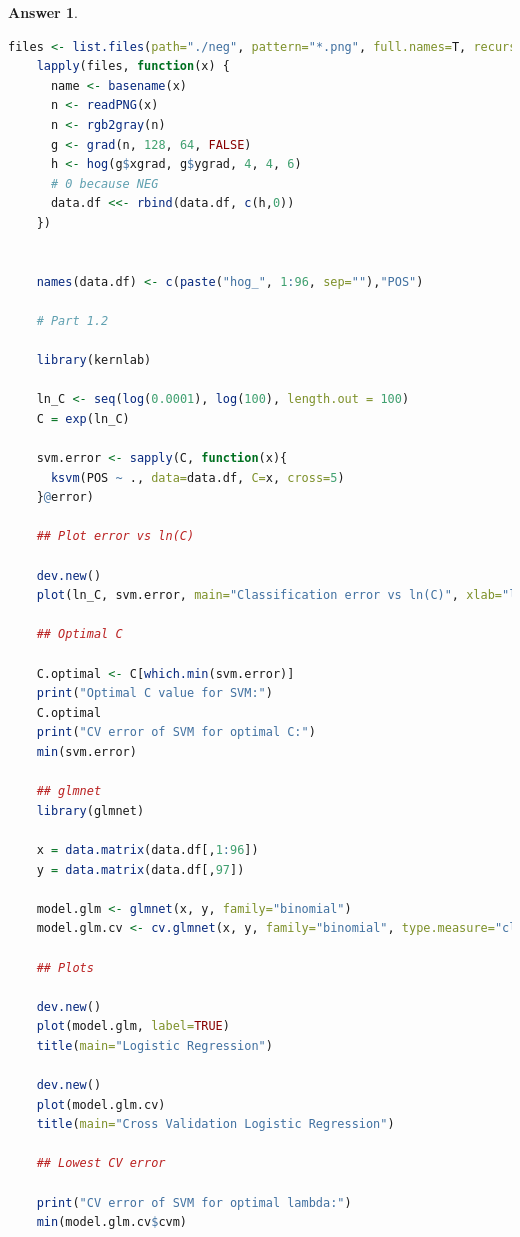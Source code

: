 \documentclass[12pt]{article}
\theoremstyle{colon}
\newtheorem*{answer}{Answer}
\begin{document}
\begin{answer}
\begin{lstlisting}[language=R, basicstyle=\scriptsize, breaklines=true]
    files <- list.files(path="./neg", pattern="*.png", full.names=T, recursive=FALSE)
    lapply(files, function(x) {
      name <- basename(x)
      n <- readPNG(x)
      n <- rgb2gray(n)
      g <- grad(n, 128, 64, FALSE)
      h <- hog(g$xgrad, g$ygrad, 4, 4, 6)
      # 0 because NEG
      data.df <<- rbind(data.df, c(h,0))
    })


    names(data.df) <- c(paste("hog_", 1:96, sep=""),"POS")

    # Part 1.2

    library(kernlab)

    ln_C <- seq(log(0.0001), log(100), length.out = 100)
    C = exp(ln_C)

    svm.error <- sapply(C, function(x){
      ksvm(POS ~ ., data=data.df, C=x, cross=5)
    }@error)

    ## Plot error vs ln(C)

    dev.new()
    plot(ln_C, svm.error, main="Classification error vs ln(C)", xlab="ln(C)", ylab="Error")

    ## Optimal C

    C.optimal <- C[which.min(svm.error)]
    print("Optimal C value for SVM:")
    C.optimal
    print("CV error of SVM for optimal C:")
    min(svm.error)

    ## glmnet
    library(glmnet)

    x = data.matrix(data.df[,1:96])
    y = data.matrix(data.df[,97])

    model.glm <- glmnet(x, y, family="binomial")
    model.glm.cv <- cv.glmnet(x, y, family="binomial", type.measure="class")

    ## Plots

    dev.new()
    plot(model.glm, label=TRUE)
    title(main="Logistic Regression")

    dev.new()
    plot(model.glm.cv)
    title(main="Cross Validation Logistic Regression")

    ## Lowest CV error

    print("CV error of SVM for optimal lambda:")
    min(model.glm.cv$cvm)
  \end{lstlisting}
\end{answer}

\clearpage
\end{document}
